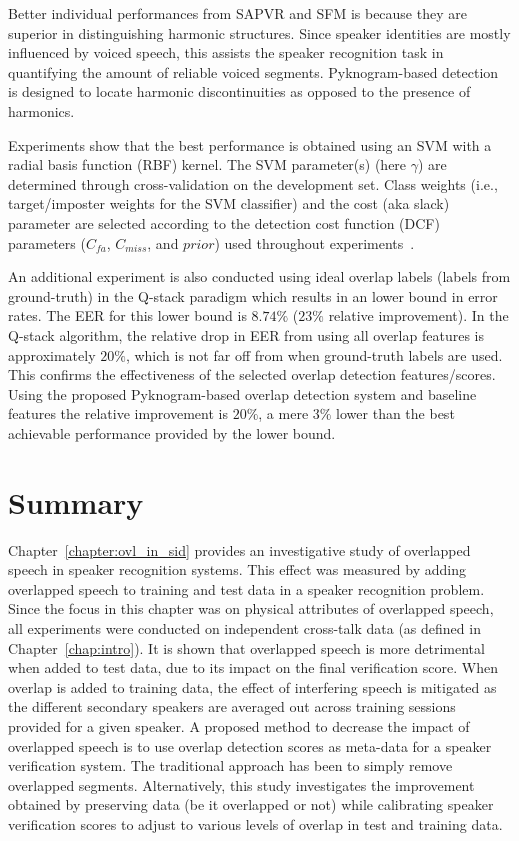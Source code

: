 \vspace{0mm}

Better individual performances from SAPVR and SFM is because they are superior in distinguishing harmonic structures. 
Since speaker identities are mostly influenced by voiced speech, this assists the speaker recognition task in quantifying the amount of reliable voiced segments. 
Pyknogram-based detection is designed to locate harmonic discontinuities as opposed to the presence of harmonics. 

Experiments show that the best performance is obtained using an SVM with a radial basis function (RBF) kernel. 
The SVM parameter(s) (here $\gamma$) are determined through cross-validation on the development set. 
Class weights (i.e., target/imposter weights for the SVM classifier) and the cost (aka slack) parameter are selected according to the detection cost function (DCF) parameters ($C_{fa}$, $C_{miss}$, and $prior$) used throughout experiments~\cite{bosaris}. %

An additional experiment is also conducted using ideal overlap labels (labels from ground-truth) in the Q-stack paradigm which results in an lower bound in error rates.
The EER for this lower bound is $8.74\%$ ($23\%$ relative improvement). 
In the Q-stack algorithm, the relative drop in EER from using all overlap features is approximately $20\%$, which is not far off from when ground-truth labels are used. 
This confirms the effectiveness of the selected overlap detection features/scores.  
Using the proposed Pyknogram-based overlap detection system and baseline features the relative improvement is $20\%$, a mere $3\%$ lower than the best achievable performance provided by the lower bound.


\section{Summary}
\label{sec:ch3_summary}
Chapter~\ref{chapter:ovl_in_sid} provides an investigative study of overlapped speech in speaker recognition systems. 
This effect was measured by adding overlapped speech to training and test data in a speaker recognition problem. 
Since the focus in this chapter was on physical attributes of overlapped speech, all experiments were conducted on independent cross-talk data (as defined in Chapter~\ref{chap:intro}). 
It is shown that overlapped speech is more detrimental when added to test data, due to its impact on the final verification score. 
When overlap is added to training data, the effect of interfering speech is mitigated as the different secondary speakers are averaged out across training sessions provided for a given speaker. 
A proposed method to decrease the impact of overlapped speech is to use overlap detection scores as meta-data for a speaker verification system. 
The traditional approach has been to simply remove overlapped segments. 
Alternatively, this study investigates the improvement obtained by preserving data (be it overlapped or not) while calibrating speaker verification scores to adjust to various levels of overlap in test and training data. 
